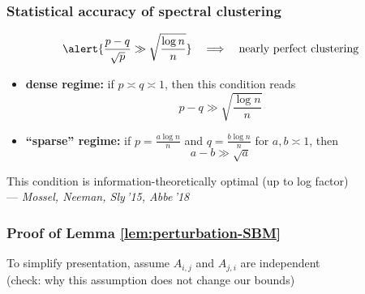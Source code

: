 \documentclass[compress,
mathserif,wide,%
]{beamer}
\begin{document}
\begin{frame}
\frametitle{Statistical accuracy of spectral clustering}

\[
	\alert{\frac{p-q}{\sqrt{p}}\gg \sqrt{\frac{\log n}{n}}} \quad \Longrightarrow \quad \text{nearly perfect clustering} 
\]

\begin{itemize}
	\item {\bf dense regime:} if $p\asymp q \asymp 1$, then this condition reads
	      \[
			p-q \gg \sqrt{\frac{\log n}{n}}
	      \]
        \item {\bf ``sparse'' regime:} if $p = \frac{a\log n}{n}$ and $q = \frac{b \log n}{n}$ for  $a,b\asymp 1$, then 
	      \[
		      a - b \gg \sqrt{a} 
	      \]

\end{itemize}


{

\begin{varblock}[\textwidth]{}
\begin{center}
	This  condition is information-theoretically optimal (up to log factor) \\
	\hfill --- {\em Mossel, Neeman, Sly\,'15, Abbe\,'18}
\end{center}
\end{varblock}
}


\end{frame}



%	
%	
%
	


\begin{frame}
\frametitle{Proof of Lemma \ref{lem:perturbation-SBM}}

\vfill
	To simplify presentation,  assume $A_{i,j}$ and $A_{j,i}$ are independent \\ \medskip \hfill (check: why this assumption does not change our bounds)
\vfill

\end{frame}
\end{document}
